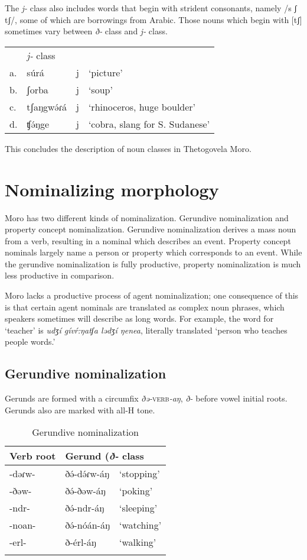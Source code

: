 The \textit{j-} class also includes words that begin with strident consonants, namely /s ʃ tʃ/, some of which are borrowings from Arabic. Those nouns which begin with [tʃ] sometimes vary between \textit{ð-} class and \textit{j-} class. 

\ea	
\begin{tabular}[t]{llll}
&	\textit{j-} class\\
a.	&	súrá	&	j	&	‘picture’\\
b.	&	ʃorba	&	j	&	‘soup’\\
c.	&	tʃaŋgwə́ɾá&	j	&	‘rhinoceros, huge boulder’\\
d.	&	ʧə́ŋge	&	j	&	‘cobra, slang for S. Sudanese’\\
\end{tabular}
\z

This concludes the description of noun classes in Thetogovela Moro. 

\section{Nominalizing morphology}\label{sec:ch6:nominalize}

Moro has two different kinds of nominalization. Gerundive nominalization and property concept nominalization. Gerundive nominalization derives a mass noun from a verb, resulting in a nominal which describes an event. Property concept nominals largely name a person or property which corresponds to an event. While the gerundive nominalization is fully productive, property nominalization is much less productive in comparison. 

Moro lacks a productive process of agent nominalization; one consequence of this is that certain agent nominals are translated as complex noun phrases, which speakers sometimes will describe as long words. For example, the word for `teacher' is \textit{udʒí gívŕ:ŋatʃa lədʒí ŋenea}, literally translated `person who teaches people words.'

\subsection{Gerundive nominalization}\label{section:gerund}

Gerunds are formed with a circumfix \textit{ðə-}\textsc{verb}\textit{-aŋ}, \textit{ð-} before vowel initial roots. Gerunds also are marked with all-H tone.

\begin{table}
\caption{Gerundive nominalization}
\begin{tabular}[t]{lll} %
\lsptoprule
Verb root	&	\multicolumn{2}{l}{Gerund (\textit{ð-} class}  	\\
\midrule
-dəɾw-	&	ðə́-də́ɾw-áŋ	&	‘stopping’\\
-ðəw-	&	ðə́-ðəw-áŋ & 	‘poking’\\
-ndr- 	&	ðə́-ndr-áŋ & ‘sleeping’\\
-noan-	&	ðə́-nóán-áŋ & ‘watching’\\
-erl-		& 	ð-érl-áŋ & `walking' \\
\lspbottomrule
\end{tabular}	
\end{table}

